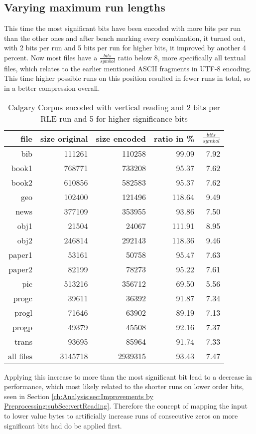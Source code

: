 \subsection{Varying maximum run lengths}
\par{
This time the most significant bits have been encoded with more bits per run than the other ones and after bench marking every combination, it turned out, with 2 bits per run and 5 bits per run for higher bits, it improved by another 4 percent. Now most files have a $\frac{bits}{symbol}$ ratio below 8, more specifically all textual files, which relates to the earlier mentioned ASCII fragments in UTF-8 encoding. This time higher possible runs on this position resulted in fewer runs in total, so in a better compression overall.
\begin{table}[H]
	\centering
	\begin{tabular}{r|r|r|r|r}	
		file & size original & size encoded & ratio in \% & $\frac{bits}{symbol}$\\
		\hline
		bib & 111261 & 110258 & 99.09 & 7.92\\
		book1 & 768771 & 733208 & 95.37 & 7.62 \\
		book2 & 610856 & 582583 & 95.37 & 7.62\\
		geo & 102400 & 121496 & 118.64 & 9.49\\
		news & 377109 & 353955 & 93.86 & 7.50\\
		obj1 & 21504 & 24067 & 111.91 & 8.95\\
		obj2& 246814 & 292143 & 118.36 & 9.46\\		 
		paper1 & 53161 & 50758 & 95.47 & 7.63\\		 
		paper2& 82199 & 78273 & 95.22 & 7.61\\		 
		pic & 513216 & 356712 & 69.50 & 5.56\\		 
		progc & 39611 & 36392 & 91.87 & 7.34\\		 
		progl & 71646 & 63902 & 89.19 & 7.13\\		 
		progp & 49379 & 45508 & 92.16 & 7.37\\		 
		trans & 93695 & 85964 & 91.74 & 7.33\\
		\hline
		all files & 3145718 & 2939315 & 93.43 & 7.47
	\end{tabular}
	\caption{Calgary Corpus encoded with vertical reading and 2 bits per RLE run and 5 for higher significance bits}
\label{tab:t42 Calgary Corpus encoded with vertical reading and 2 bits per RLE run and 5 for higher significance bits}
\end{table}
}
\par{
Applying this increase to more than the most significant bit lead to a decrease in performance, which most likely related to the shorter runs on lower order bits, seen in Section \ref{ch:Analysis:sec:Improvements by Preprocessing:subSec:vertReading}. Therefore the concept of mapping the input to lower value bytes to artificially increase runs of consecutive zeros on more significant bits had do be applied first.
}

